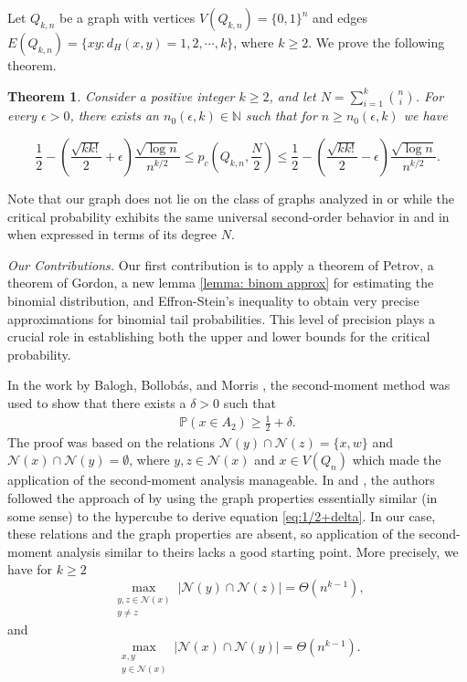 \documentclass[reqno,11pt]{amsart}
\newtheorem{theorem}{Theorem}
\renewcommand{\leq}{\leqslant}
\renewcommand{\geq}{\geqslant}
\begin{document}
Let $Q_{k,n}$ be a graph with vertices $V(Q_{k,n})=\{0,1\}^n$ and edges $E(Q_{k,n})=\{xy:d_H(x,y)=1,2,\cdots,k\}$, where $k \geq 2$. We prove the following theorem.

\begin{theorem} \label{theorem:main}
    Consider a positive integer $k \geq 2$, and let $N=\sum_{i=1}^k \binom{n}{i}$. For every $\epsilon >0$, there exists an $n_0(\epsilon,k) \in \mathbb{N}$ such that for $n \geq n_0(\epsilon,k)$ we have 
    
$$  \frac{1}{2}- \left(\frac{\sqrt{kk!}}{2}+\epsilon \right)\frac{\sqrt{\log n}}{n^{k/2}} \leq p_c\left(Q_{k,n},\frac{N}{2} \right) \leq \frac{1}{2}- \left(\frac{\sqrt{kk!}}{2}-\epsilon \right)\frac{\sqrt{\log n}}{n^{k/2}}.$$


\end{theorem}
Note that our graph does not lie on the class of graphs analyzed in 
\cite{collares2024universalbehaviourmajoritybootstrap} or \cite{COLLARES2026104347} while the critical probability exhibits the same universal second-order behavior in \cite{collares2024universalbehaviourmajoritybootstrap} and in \cite{COLLARES2026104347} when expressed in terms of its degree $N$. 

\emph{Our Contributions.} Our first contribution is to apply a theorem of Petrov, a theorem of Gordon, a new lemma \ref{lemma: binom approx} for estimating the binomial distribution, and Effron-Stein's inequality to obtain very precise approximations for binomial tail probabilities. This level of precision  plays a crucial role in establishing both the upper and lower bounds for the critical probability. 

In the work by Balogh, Bollob{\'a}s, and Morris \cite{balogh_bollobas_morris_2009}, the second-moment method was used to show that there exists a $\delta >0$ such that 
\begin{align} 
    \mathbb{P}(x \in A_2) \geq \frac{1}{2}+\delta. \label{eq:1/2+delta}
\end{align}
The proof was based on the relations $\mathcal{N}(y) \cap \mathcal{N}(z)=\{x,w\}$ and $\mathcal{N}(x) \cap \mathcal{N}(y)=\emptyset$, where $y, z \in \mathcal{N}(x)$ and $x \in V(Q_n)$ which made the application of the second-moment analysis manageable. In \cite{collares2024universalbehaviourmajoritybootstrap} and \cite{COLLARES2026104347}, the authors followed the approach of \cite{balogh_bollobas_morris_2009} by using the graph properties essentially similar (in some sense) to the hypercube to derive equation \ref{eq:1/2+delta}. In our case, these relations and the graph properties are absent, so application of the second-moment analysis similar to theirs lacks a good starting point. More precisely, we have for $k \geq 2$ 
$$\max_{\substack{y,z \in \mathcal{N}(x)\\y \neq z} } |\mathcal{N}(y) \cap \mathcal{N}(z)|=\Theta(n^{k-1}),$$
and 
$$\max_{\substack{x,y\\ y \in \mathcal{N}(x)}}|\mathcal{N}(x) \cap \mathcal{N}(y)|=\Theta(n^{k-1}).$$
\end{document}
